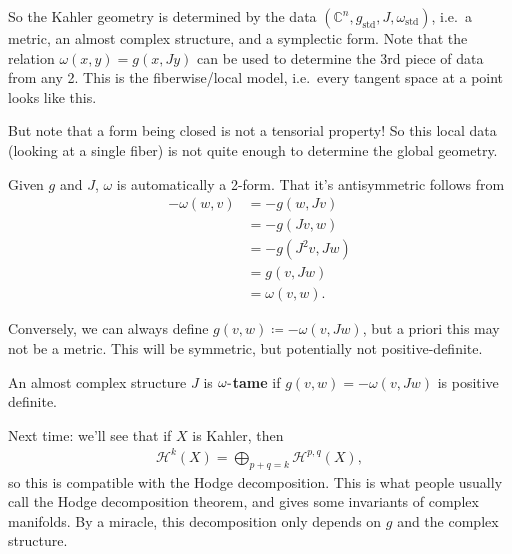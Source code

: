 \begin{remark}

So the Kahler geometry is determined by the data
\(({\mathbb{C}}^n, g_\text{std}, J, \omega_\text{std})\), i.e.~a metric,
an almost complex structure, and a symplectic form. Note that the
relation \(\omega(x, y) = g(x, Jy)\) can be used to determine the 3rd
piece of data from any 2. This is the fiberwise/local model, i.e.~every
tangent space at a point looks like this.

\end{remark}

\begin{warnings}

But note that a form being closed is not a tensorial property! So this
local data (looking at a single fiber) is not quite enough to determine
the global geometry.

\end{warnings}

\begin{remark}

Given \(g\) and \(J\), \(\omega\) is automatically a 2-form. That it's
antisymmetric follows from
\begin{align*}
-\omega(w, v)
&= -g(w, Jv) \\
&= -g(Jv, w) \\
&= -g(J^2 v, Jw)\\
&= g(v, Jw)\\
&= \omega(v, w)
.\end{align*}

Conversely, we can always define \(g(v, w) \coloneqq- \omega(v, Jw)\),
but a priori this may not be a metric. This will be symmetric, but
potentially not positive-definite.

\end{remark}

\begin{definition}[?]

An almost complex structure \(J\) is \textbf{\(\omega{\hbox{-}}\)tame}
if \(g(v, w) = - \omega(v, Jw)\) is positive definite.

\end{definition}

\begin{remark}

Next time: we'll see that if \(X\) is Kahler, then
\begin{align*} 
{\mathcal{H}}^k(X) = \bigoplus_{p+q=k} {\mathcal{H}}^{p, q}(X), 
\end{align*}
so this is compatible with the Hodge decomposition. This is what people
usually call the Hodge decomposition theorem, and gives some invariants
of complex manifolds. By a miracle, this decomposition only depends on
\(g\) and the complex structure.

\end{remark}

